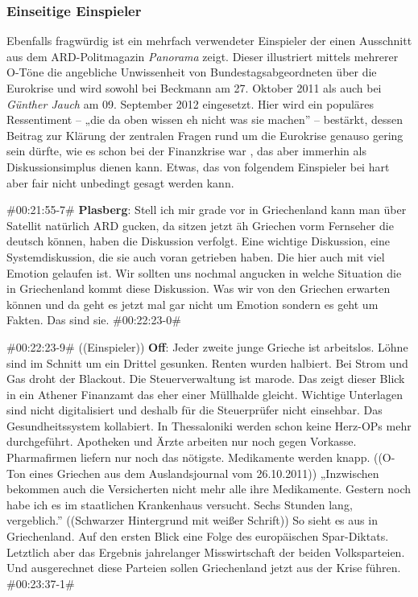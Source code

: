\subsubsection{Einseitige Einspieler}

Ebenfalls fragwürdig ist ein mehrfach verwendeter Einspieler der einen Ausschnitt aus dem ARD-Politmagazin \textit{Panorama} zeigt. Dieser illustriert mittels mehrerer O-Töne die angebliche Unwissenheit von Bundestagsabgeordneten über die Eurokrise und wird sowohl bei Beckmann am 27. Oktober 2011 als auch bei \textit{Günther Jauch} am 09. September 2012 eingesetzt. Hier wird ein populäres Ressentiment – „die da oben wissen eh nicht was sie machen” – bestärkt, dessen Beitrag zur Klärung der zentralen Fragen rund um die Eurokrise genauso gering sein dürfte, wie es schon bei der Finanzkrise war \parencite[12ff.]{kohlerImBlindflugDurch2009}, das aber immerhin als Diskussionsimplus dienen kann. Etwas, das von folgendem Einspieler bei hart aber fair nicht unbedingt gesagt werden kann.

\begin{description}
	\begin{linenumbers}[1]
		\item \#00:21:55-7\# \textbf{Plasberg}: Stell ich mir grade vor in Griechenland kann man über Satellit natürlich ARD gucken, da sitzen jetzt äh Griechen vorm Fernseher die deutsch können, haben die Diskussion verfolgt. Eine wichtige Diskussion, eine Systemdiskussion, die sie auch voran getrieben haben. Die hier auch mit viel Emotion gelaufen ist. Wir sollten uns nochmal angucken in welche Situation die in Griechenland kommt diese Diskussion. Was wir von den Griechen erwarten können und da geht es jetzt mal gar nicht um Emotion sondern es geht um Fakten. Das sind sie. \#00:22:23-0\#
		
		\item \#00:22:23-9\# ((Einspieler)) \textbf{Off}: Jeder zweite junge Grieche ist arbeitslos. Löhne sind im Schnitt um ein Drittel gesunken. Renten wurden halbiert. Bei Strom und Gas droht der Blackout. Die Steuerverwaltung ist marode. Das zeigt dieser Blick in ein Athener Finanzamt das eher einer Müllhalde gleicht. Wichtige Unterlagen sind nicht digitalisiert und deshalb für die Steuerprüfer nicht einsehbar. Das Gesundheitssystem kollabiert. In Thessaloniki werden schon keine Herz-OPs mehr durchgeführt. Apotheken und Ärzte arbeiten nur noch gegen Vorkasse. Pharmafirmen liefern nur noch das nötigste. Medikamente werden knapp. ((O-Ton eines Griechen aus dem Auslandsjournal vom 26.10.2011)) „Inzwischen bekommen auch die Versicherten nicht mehr alle ihre Medikamente. Gestern noch habe ich es im staatlichen Krankenhaus versucht. Sechs Stunden lang, vergeblich.” ((Schwarzer Hintergrund mit weißer Schrift)) So sieht es aus in Griechenland. Auf den ersten Blick eine Folge des europäischen Spar-Diktats. Letztlich aber das Ergebnis jahrelanger Misswirtschaft der beiden Volksparteien. Und ausgerechnet diese Parteien sollen Griechenland jetzt aus der Krise führen. \#00:23:37-1\# 
	\end{linenumbers}
	\label{lis:14}
\end{description}

